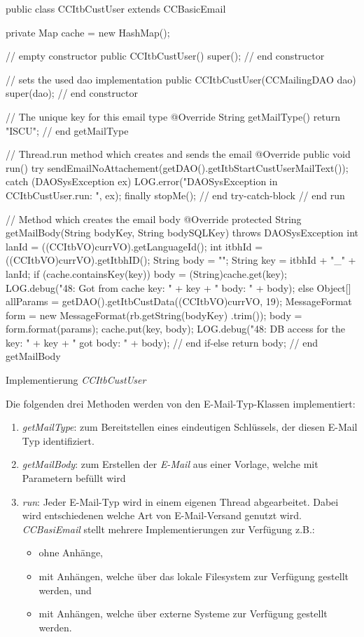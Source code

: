 \begin{program}
\begin{JavaCode}
public class CCItbCustUser extends CCBasicEmail {
	
	private Map cache = new HashMap();

	// empty constructor
	public CCItbCustUser() {
		super();
	} // end constructor
	
	// sets the used dao implementation
	public CCItbCustUser(CCMailingDAO dao) {
		super(dao);
	} // end constructor

	// The unique key for this email type
	@Override
	String getMailType() {
		return "ISCU";
	} // end getMailType
	
	// Thread.run method which creates and sends the email
	@Override
	public void run() {
		try {
			sendEmailNoAttachement(getDAO().getItbStartCustUserMailText());
		} catch (DAOSysException ex) {
			LOG.error("DAOSysException in CCItbCustUser.run: ", ex);
		} finally {
			stopMe();
		} // end try-catch-block
	} // end run
	
	// Method which creates the email body
	@Override
	protected String getMailBody(String bodyKey, String bodySQLKey)
		throws DAOSysException {
		int lanId   = ((CCItbVO)currVO).getLanguageId();
		int itbhId  = ((CCItbVO)currVO).getItbhID();
		String body = "";
		String key  = itbhId + "_" + lanId;
		if (cache.containsKey(key)) {
			body = (String)cache.get(key);
			LOG.debug("48: Got from cache key: " + key 
					  + " body: " + body);
		} else {
			Object[] allParams = getDAO().getItbCustData((CCItbVO)currVO, 19);
			MessageFormat form = new MessageFormat(rb.getString(bodyKey)
			                                         .trim());
	 		body               = form.format(params);
	 		cache.put(key, body);
	 		LOG.debug("48: DB access for the key: " + key
	 				+ " got body: " + body);
		} // end if-else
		return body;
	} // end getMailBody
}
\end{JavaCode}
\caption{Implementierung \emph{CCItbCustUser}}
\label{fig:code-ccitbcustuser}
\label{CCItbCustUser.java}
\end{program}
\newpage
Die folgenden drei Methoden werden von den E-Mail-Typ-Klassen implementiert:
\begin{enumerate}
	\item\emph{getMailType}: zum Bereitstellen eines eindeutigen Schlüssels, der diesen E-Mail Typ identifiziert.
	\item\emph{getMailBody}: zum Erstellen der \emph{E-Mail} aus einer Vorlage, welche mit Parametern befüllt wird
	\item\emph{run}: Jeder E-Mail-Typ wird in einem eigenen Thread abgearbeitet. Dabei wird entschiedenen welche Art von E-Mail-Versand genutzt wird. \emph{CCBasiEmail} stellt mehrere Implementierungen zur Verfügung z.B.:
	\begin{itemize}
		\item ohne Anhänge, 
		\item mit Anhängen, welche über das lokale Filesystem zur Verfügung gestellt werden, und
		\item mit Anhängen, welche über externe Systeme zur Verfügung gestellt werden.
	\end{itemize}
\end{enumerate}
